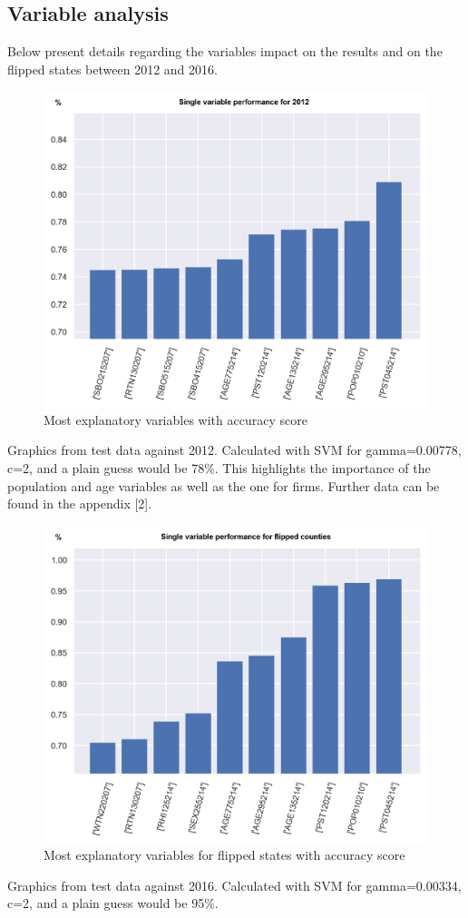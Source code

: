 \subsection{Variable analysis}
Below present details regarding the variables impact on the results and on the flipped states between 2012 and 2016.
\begin{figure}[H]
\centering
\includegraphics[scale=0.2]{pictures/results/max_12.png} 
\caption{Most explanatory variables with accuracy score}
\end{figure}
Graphics from test data against 2012. Calculated with SVM for gamma=0.00778, c=2, and a plain guess would be 78\%. This highlights the importance of the population and age variables as well as the one for firms. Further data can be found in the appendix [2].

\begin{figure}[H]
\centering
\includegraphics[scale=0.2]{pictures/results/max_flipp.png}
\caption{Most explanatory variables for flipped states with accuracy score}
\end{figure}
Graphics from test data against 2016. Calculated with SVM for gamma=0.00334, c=2, and a plain guess would be 95\%.

